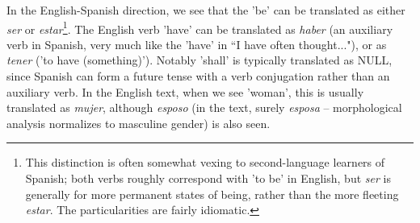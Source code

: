 In the English-Spanish direction, we see that the 'be' can be translated as
either \emph{ser} or \emph{estar}\footnote{This distinction is often somewhat
vexing to second-language learners of Spanish; both verbs roughly correspond
with 'to be' in English, but \emph{ser} is generally for more permanent states
of being, rather than the more fleeting \emph{estar}. The particularities are
fairly idiomatic.}. The English verb 'have' can be translated as \emph{haber}
(an auxiliary verb in Spanish, very much like the 'have' in ``I have often
thought..."), or as \emph{tener} ('to have (something)'). Notably 'shall' is
typically translated as NULL, since Spanish can form a future tense with a verb
conjugation rather than an auxiliary verb. In the English text, when we see
'woman', this is usually translated as \emph{mujer}, although \emph{esposo} (in
the text, surely \emph{esposa} -- morphological analysis normalizes to
masculine gender) is also seen.

